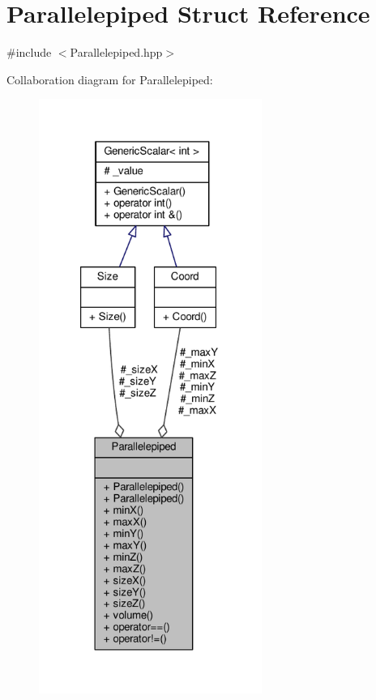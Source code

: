 \hypertarget{struct_parallelepiped}{\section{Parallelepiped Struct Reference}
\label{struct_parallelepiped}
}


{\ttfamily \#include $<$Parallelepiped.\-hpp$>$}



Collaboration diagram for Parallelepiped\-:
\nopagebreak
\begin{figure}[H]
\begin{center}
\leavevmode
\includegraphics[height=550pt]{struct_parallelepiped__coll__graph}
\end{center}
\end{figure}
